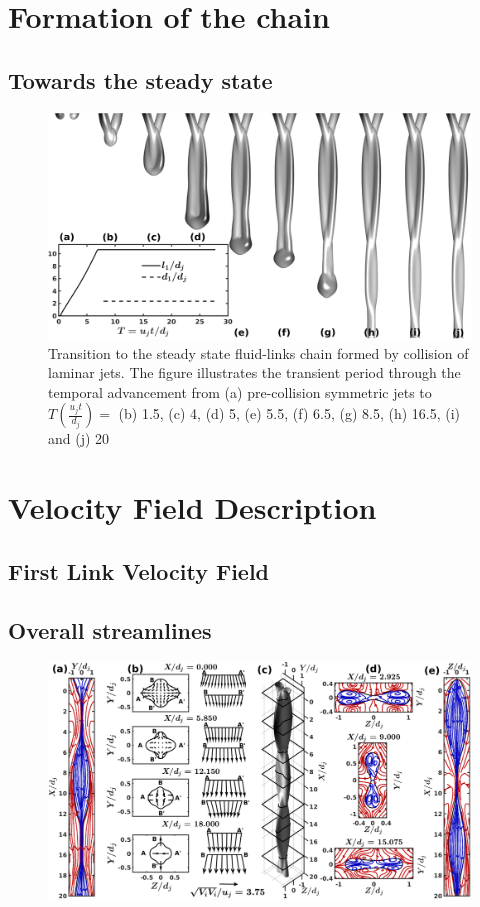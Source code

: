 \documentclass[%
aip,
sd,%
amsmath,amssymb,
preprint,%
author-year,%
]{revtex4-1}
\begin{document}
\section{Formation of the chain}
\lipsum[1]
\subsection{Towards the steady state}
\lipsum[1]
\begin{figure}
	\centering
	\includegraphics[width=\linewidth]{fig0}
	\caption{Transition to the steady state fluid-links chain formed by collision of laminar jets. The figure illustrates the transient period through the temporal advancement from (a) pre-collision symmetric jets to $T (\frac{u_jt}{d_j}) = $ (b) 1.5, (c) 4, (d) 5, (e) 5.5, (f) 6.5, (g) 8.5, (h) 16.5, (i) and (j) 20}
	\label{Figure::transient}
\end{figure}
\lipsum
\section{Velocity Field Description}
\lipsum[1]
\subsection{First Link Velocity Field}
\lipsum
\subsection{Overall streamlines}
\lipsum[1]
\begin{figure}
	\centering
	\includegraphics[width=\linewidth]{streamlinesDetails}
	\caption{}
	\label{Figure::streamDetails}
\end{figure}
\lipsum
\end{document}
